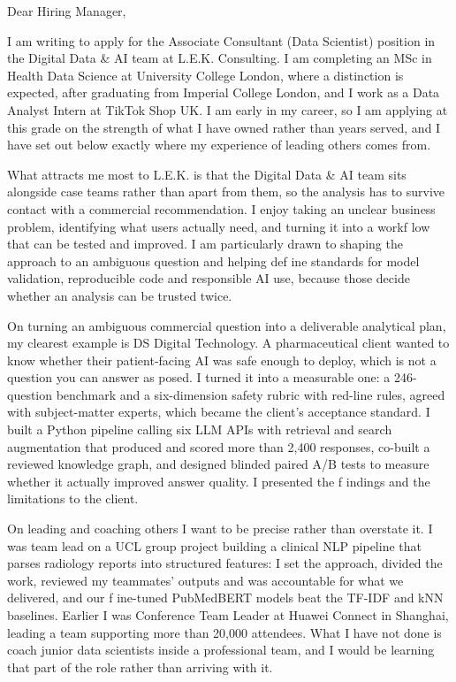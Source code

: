 \documentclass[letterpaper,11pt]{article}
\begin{document}
Dear Hiring Manager,

I am writing to apply for the Associate Consultant (Data Scientist) position in the Digital Data \& AI team at L.E.K. Consulting. I am completing an MSc in Health Data Science at University College London, where a distinction is expected, after graduating from Imperial College London, and I work as a Data Analyst Intern at TikTok Shop UK. I am early in my career, so I am applying at this grade on the strength of what I have owned rather than years served, and I have set out below exactly where my experience of leading others comes from.

What attracts me most to L.E.K. is that the Digital Data \& AI team sits alongside case teams rather than apart from them, so the analysis has to survive contact with a commercial recommendation. I enjoy taking an unclear business problem, identifying what users actually need, and turning it into a workf\kern0pt low that can be tested and improved. I am particularly drawn to shaping the approach to an ambiguous question and helping def\kern0pt ine standards for model validation, reproducible code and responsible AI use, because those decide whether an analysis can be trusted twice.

On turning an ambiguous commercial question into a deliverable analytical plan, my clearest example is DS Digital Technology. A pharmaceutical client wanted to know whether their patient-facing AI was safe enough to deploy, which is not a question you can answer as posed. I turned it into a measurable one: a 246-question benchmark and a six-dimension safety rubric with red-line rules, agreed with subject-matter experts, which became the client's acceptance standard. I built a Python pipeline calling six LLM APIs with retrieval and search augmentation that produced and scored more than 2,400 responses, co-built a reviewed knowledge graph, and designed blinded paired A/B tests to measure whether it actually improved answer quality. I presented the f\kern0pt indings and the limitations to the client.

On leading and coaching others I want to be precise rather than overstate it. I was team lead on a UCL group project building a clinical NLP pipeline that parses radiology reports into structured features: I set the approach, divided the work, reviewed my teammates' outputs and was accountable for what we delivered, and our f\kern0pt ine-tuned PubMedBERT models beat the TF-IDF and kNN baselines. Earlier I was Conference Team Leader at Huawei Connect in Shanghai, leading a team supporting more than 20,000 attendees. What I have not done is coach junior data scientists inside a professional team, and I would be learning that part of the role rather than arriving with it.
\end{document}
